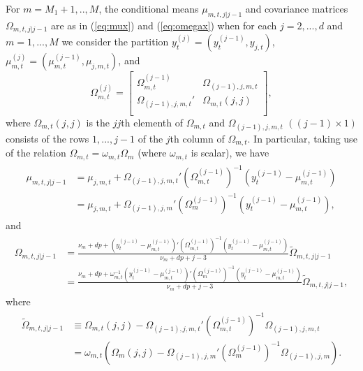 \documentclass[nojss]{jss}
\begin{document}
\begin{appendix}
For $m=M_1+1,..,M$, the conditional means $\mu_{m,t,j|j-1}$ and covariance matrices $\Omega_{m,t,j|j-1}$ are as in (\ref{eq:mux}) and (\ref{eq:omegax}) when for each $j=2,...,d$ and $m=1,...,M$ we consider the partition $y_t^{(j)}=(y_t^{(j-1)},y_{j,t})$, $\mu_{m,t}^{(j)}=(\mu_{m,t}^{(j-1)},\mu_{j,m,t})$, and
\begin{equation}
\Omega_{m,t}^{(j)}=
\begin{bmatrix}
\Omega_{m,t}^{(j-1)} \quad\enspace & \Omega_{(j-1),j,m,t} \\
\Omega_{(j-1),j,m,t}' & \Omega_{m,t}(j,j)  \\
\end{bmatrix},
\end{equation}
where $\Omega_{m,t}(j,j)$ is the $jj$th elementh of $\Omega_{m,t}$ and $\Omega_{(j-1),j,m,t}$ $((j-1)\times 1)$  consists of the rows $1,...,j-1$ of the $j$th column of $\Omega_{m,t}$.  In particular,  taking use of the relation $\Omega_{m,t}=\omega_{m,t}\Omega_m$ (where $\omega_{m,t}$ is scalar), we have
\begin{align}
\begin{aligned}
\mu_{m,t,j|j-1} &=\mu_{j,m,t} + \Omega_{(j-1),j,m,t}'(\Omega_{m,t}^{(j-1)})^{-1}(y_t^{(j-1)}-\mu_{m,t}^{(j-1)})\\
&=\mu_{j,m,t} + \Omega_{(j-1),j,m}'(\Omega_{m}^{(j-1)})^{-1}(y_t^{(j-1)}-\mu_{m,t}^{(j-1)}),
\end{aligned}\label{eq:cond_mu_mtj}
\end{align}
and
\begin{align}
\begin{aligned}
\Omega_{m,t,j|j-1} &= \frac{\nu_m + dp + (y_t^{(j-1)} - \mu_{m,t}^{(j - 1)})'(\Omega_{m,t}^{(j-1)})^{-1}(y_t^{(j-1)} - \mu_{m,t}^{(j - 1)})}{\nu_m + dp + j - 3}\tilde{\Omega}_{m,t,j|j-1}\\
&= \frac{\nu_m + dp + \omega_{m,t}^{-1}(y_t^{(j-1)} - \mu_{m,t}^{(j - 1)})'(\Omega_{m}^{(j-1)})^{-1}(y_t^{(j-1)} - \mu_{m,t}^{(j - 1)})}{\nu_m + dp + j - 3}\tilde{\Omega}_{m,t,j|j-1},
\end{aligned}\label{eq:cond_omega_mtj}
\end{align}
where
\begin{align}
\begin{aligned}
\tilde{\Omega}_{m,t,j|j-1} &\equiv \Omega_{m,t}(j,j) - \Omega_{(j-1),j,m,t}'(\Omega_{m,t}^{(j-1)})^{-1} \Omega_{(j-1),j,m,t}\\
&=\omega_{m,t}(\Omega_{m}(j,j) - \Omega_{(j-1),j,m}'(\Omega_{m}^{(j-1)})^{-1} \Omega_{(j-1),j,m}).
\end{aligned}
\end{align}


\end{appendix}
\end{document}
